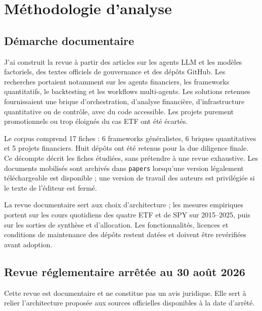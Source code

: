 \chapter{Méthodologie d'analyse}\label{cap:methodologie}

\section{Démarche documentaire}

J'ai construit la revue à partir des articles sur les agents LLM et les modèles factoriels, des textes officiels de gouvernance et des dépôts GitHub. Les recherches portaient notamment sur les agents financiers, les frameworks quantitatifs, le backtesting et les workflows multi-agents. Les solutions retenues fournissaient une brique d'orchestration, d'analyse financière, d'infrastructure quantitative ou de contrôle, avec du code accessible. Les projets purement promotionnels ou trop éloignés du cas ETF ont été écartés.

Le corpus comprend 17 fiches : 6 frameworks généralistes, 6 briques quantitatives et 5 projets financiers. Huit dépôts ont été retenus pour la due diligence finale. Ce décompte décrit les fiches étudiées, sans prétendre à une revue exhaustive. Les documents mobilisés sont archivés dans \texttt{papers} lorsqu'une version légalement téléchargeable est disponible ; une version de travail des auteurs est privilégiée si le texte de l'éditeur est fermé.

La revue documentaire sert aux choix d'architecture ; les mesures empiriques portent sur les cours quotidiens des quatre ETF et de SPY sur 2015--2025, puis sur les sorties de synthèse et d'allocation. Les fonctionnalités, licences et conditions de maintenance des dépôts restent datées et doivent être revérifiées avant adoption.

\section{Revue réglementaire arrêtée au 30 août 2026}

Cette revue est documentaire et ne constitue pas un avis juridique. Elle sert à relier l'architecture proposée aux sources officielles disponibles à la date d'arrêté.

